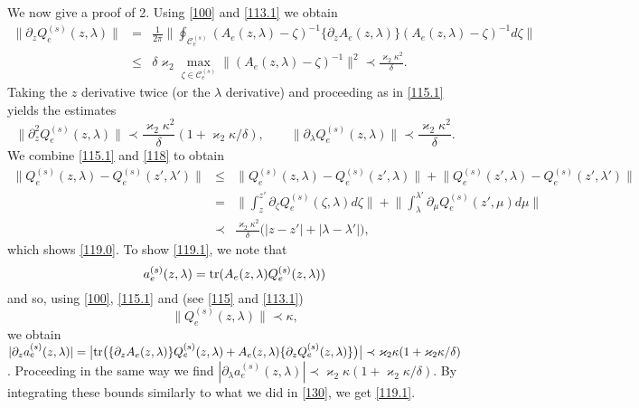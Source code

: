 \documentclass[letterpaper,onecolumn,11pt,accepted=2021-12-09]{quantumarticle}
\numberwithin{equation}{section}
\newcommand{\aes}{a_e^{(s)}}
\newcommand{\Qes}{Q_e^{(s)}}
\begin{document}
We now give a proof of 2.  Using \eqref{100} and \eqref{113.1} we obtain 
\begin{eqnarray}
	\big\| \partial_z \Qes(z,\lambda) \big\| &=& \frac{1}{2\pi}\big\| \oint_{{\mathcal C}_e^{(s)}} (A_e(z,\lambda) - \zeta)^{-1}\{ \partial_zA_e(z,\lambda)\} (A_e(z,\lambda) - \zeta)^{-1} d\zeta\big\|\nonumber\\
	&\le& \delta   \varkappa_2  \max_{\zeta\in{\mathcal C}_e^{(s)}} \|(A_e(z,\lambda) - \zeta)^{-1}\|^2 \prec \frac{\varkappa_2\kappa^2}{\delta}. 
	\label{115.1}
\end{eqnarray}
Taking the $z$ derivative twice (or the $\lambda$ derivative) and proceeding as in \eqref{115.1} yields the estimates
\begin{equation}
	\big\| \partial_z^2\Qes(z,\lambda) \big\| 
	\prec \frac{\varkappa_2 \kappa^2}{\delta} (1+\varkappa_2\kappa/\delta),\qquad 	\big\| \partial_\lambda \Qes(z,\lambda) \big\| \prec \frac{\varkappa_2\kappa^2}{\delta}. 
	\label{118}
\end{equation}
We combine \eqref{115.1} and \eqref{118} to obtain
\begin{eqnarray}
	\big\| \Qes(z,\lambda)-\Qes(z',\lambda')\big\| &\le& \big\| \Qes(z,\lambda)-\Qes(z',\lambda)\big\| + \big\| \Qes(z',\lambda)-\Qes(z',\lambda')\big\| \nonumber\\
	&=& \big\| \int_z^{z'} \partial_\zeta \Qes(\zeta,\lambda) d\zeta\big\| +\big\| \int_\lambda^{\lambda'} \partial_\mu \Qes(z',\mu) d\mu\big\| \nonumber\\
	&\prec& \frac{\varkappa_2 \kappa^2 }{\delta}\big(|z-z'| +|\lambda-\lambda'|\big),
	\label{130}
\end{eqnarray}
which shows \eqref{119.0}.  To show \eqref{119.1}, we note that \begin{equation}
	\aes(z,\lambda) ={\rm tr}(A_e(z,\lambda)\Qes(z,\lambda))
	\label{trace}
\end{equation} 
and so, using \eqref{100}, \eqref{115.1} and (see \eqref{115}  and \eqref{113.1})
\begin{equation}
	\label{bnd}
	\|\Qes(z,\lambda)\|\prec \kappa,
\end{equation} 
we obtain $| \partial_z\aes(z,\lambda)| = \big|{\rm tr}\big( \{\partial_zA_e(z,\lambda)\}\Qes(z,\lambda) + A_e(z,\lambda)\{\partial_z \Qes(z,\lambda)\}\big)\big|\prec \varkappa_2 \kappa (1+\varkappa_2\kappa/\delta)$. 
Proceeding in the same way we find $| \partial_\lambda\aes(z,\lambda)| \prec\varkappa_2 \kappa (1+\varkappa_2\kappa/\delta)$. By 
 integrating these bounds similarly to what we did in \eqref{130},  we get \eqref{119.1}. 
 
\end{document}
